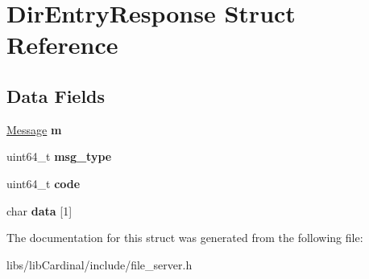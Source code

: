 \hypertarget{structDirEntryResponse}{}\section{Dir\+Entry\+Response Struct Reference}
\label{structDirEntryResponse}
\subsection*{Data Fields}
\begin{DoxyCompactItemize}
\item 
\hyperlink{structMessage}{Message} {\bfseries m}\hypertarget{structDirEntryResponse_a063fb8ed1b1f0eef705cebea49ac3bc6}{}\label{structDirEntryResponse_a063fb8ed1b1f0eef705cebea49ac3bc6}

\item 
uint64\+\_\+t {\bfseries msg\+\_\+type}\hypertarget{structDirEntryResponse_a0c3a9747b2a36735aead755dad6fe529}{}\label{structDirEntryResponse_a0c3a9747b2a36735aead755dad6fe529}

\item 
uint64\+\_\+t {\bfseries code}\hypertarget{structDirEntryResponse_a26ceb20384f4f46dc4235a335d577156}{}\label{structDirEntryResponse_a26ceb20384f4f46dc4235a335d577156}

\item 
char {\bfseries data} \mbox{[}1\mbox{]}\hypertarget{structDirEntryResponse_a93441aa54cb487e8bd13f64a2f6ef9ec}{}\label{structDirEntryResponse_a93441aa54cb487e8bd13f64a2f6ef9ec}

\end{DoxyCompactItemize}


The documentation for this struct was generated from the following file\+:\begin{DoxyCompactItemize}
\item 
libs/lib\+Cardinal/include/file\+\_\+server.\+h\end{DoxyCompactItemize}
